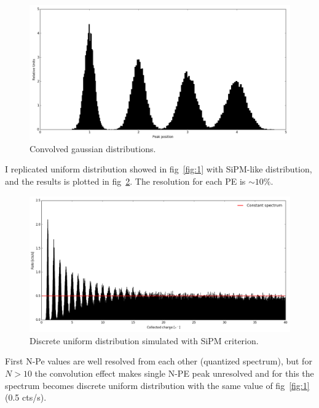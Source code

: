 \documentclass[10pt,a4paper, openany]{book}
\begin{document}
\begin{figure}[!h]
\begin{center}
\includegraphics[scale=0.28]{imm/peaks.png}
\end{center}
\caption{Convolved gaussian distributions.}
\label{fig:2}
\end{figure}
I replicated uniform distribution showed in fig~\ref{fig:1} with SiPM-like distribution, and the results is plotted in fig~\ref{fig:3}. The resolution for each PE is $\sim 10\%$.
\begin{figure}[!h]
\begin{center}
\includegraphics[scale=0.3]{imm/sim_const2.png}
\end{center}
\caption{Discrete uniform distribution simulated with SiPM criterion.}
\label{fig:3}
\end{figure}

First N-Pe values are well resolved from each other (quantized spectrum), but for $N>10$ the convolution effect makes single N-PE peak unresolved and for this the spectrum becomes discrete uniform distribution with the same value of fig~\ref{fig:1} (0.5 cts/s).
\end{document}
